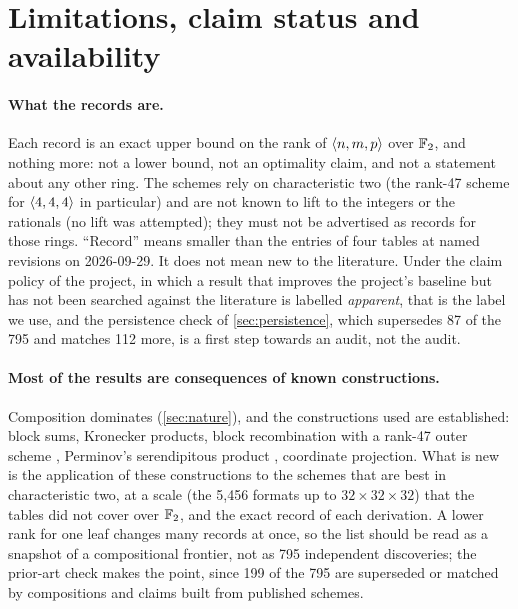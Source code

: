 \section{Limitations, claim status and availability}\label{sec:limits}

\paragraph{What the records are.}
Each record is an exact upper bound on the rank of $\langle n,m,p\rangle$ over ${\mathbb{F}_2}$, and nothing more: not a lower bound, not an optimality claim, and not a statement about any other ring. The schemes rely on characteristic two (the rank-47 scheme for $\langle 4,4,4\rangle$ in particular) and are not known to lift to the integers or the rationals (no lift was attempted); they must not be advertised as records for those rings.
``Record'' means smaller than the entries of four tables at named revisions on 2026-09-29. It does not mean new to the literature. Under the claim policy of the project, in which a result that improves the project's baseline but has not been searched against the literature is labelled \emph{apparent}, that is the label we use, and the persistence check of \cref{sec:persistence}, which supersedes 87 of the 795 and matches 112 more, is a first step towards an audit, not the audit.

\paragraph{Most of the results are consequences of known constructions.}
Composition dominates (\cref{sec:nature}), and the constructions used are established: block sums, Kronecker products, block recombination with a rank-47 outer scheme \cite{sedoglavic2017seven,drevet2011optimization}, Perminov's serendipitous product \cite{perminov2026serendipitous}, coordinate projection. What is new is the application of these constructions to the schemes that are best in characteristic two, at a scale (the 5{,}456 formats up to $32\times32\times32$) that the tables did not cover over ${\mathbb{F}_2}$, and the exact record of each derivation. A lower rank for one leaf changes many records at once, so the list should be read as a snapshot of a compositional frontier, not as 795 independent discoveries; the prior-art check makes the point, since 199 of the 795 are superseded or matched by compositions and claims built from published schemes.

